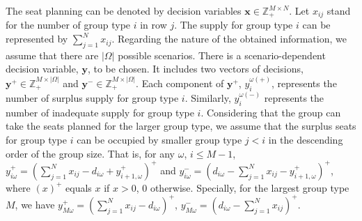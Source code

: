 The seat planning can be denoted by decision variables $\mathbf{x}\in \mathbb{Z}_{+}^{M \times N}$. Let $x_{ij}$ stand for the number of group type $i$ in row $j$. The supply for group type $i$ can be represented by $\sum_{j=1}^N x_{ij}$.
Regarding the nature of the obtained information, we assume that there are $|\Omega|$ possible scenarios. There is a scenario-dependent decision variable, $\mathbf{y}$, to be chosen. It includes two vectors of decisions, $\mathbf{y}^{+} \in \mathbb{Z}_{+}^{M \times |\Omega|}$ and $\mathbf{y}^{-} \in \mathbb{Z}_{+}^{M \times |\Omega|}$. Each component of $\mathbf{y}^{+}$, $y_{i}^{\omega(+)}$, represents the number of surplus supply for group type $i$. Similarly, $y_{i}^{\omega(-)}$ represents the number of inadequate supply for group type $i$.
Considering that the group can take the seats planned for the larger group type, we assume that the surplus seats for group type $i$ can be occupied by smaller group type $j<i$ in the descending order of the group size. That is, for any $\omega$, $i \leq M-1$, $y_{i \omega}^{+}=\left(\sum_{j=1}^N x_{ij}- d_{i \omega} + y_{i+1, \omega}^{+}\right)^{+}$ and $y_{i \omega}^{-}=\left(d_{i \omega}- \sum_{j=1}^N x_{ij} - y_{i+1, \omega}^{+} \right)^{+}$, where $(x)^{+}$ equals $x$ if $x>0$, $0$ otherwise. Specially, for the largest group type $M$, we have $y_{M \omega}^{+} = (\sum_{j=1}^N x_{ij} - d_{i \omega})^{+}$, $y_{M \omega}^{-} = (d_{i \omega}- \sum_{j=1}^N x_{ij})^{+}$.






